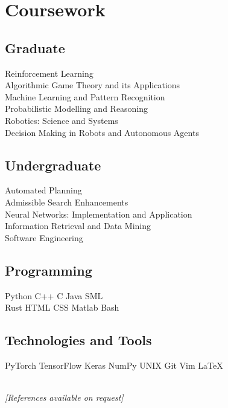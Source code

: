 \documentclass[]{lukas-cv}
\begin{document}
\begin{minipage}[t]{0.33\textwidth}
\section{Coursework}
\subsection{Graduate}
Reinforcement Learning \\
Algorithmic Game Theory and its Applications \\
Machine Learning and Pattern Recognition \\
Probabilistic Modelling and Reasoning \\
Robotics: Science and Systems \\
Decision Making in Robots and Autonomous Agents \\
\sectionsep

\subsection{Undergraduate}
Automated Planning \\
Admissible Search Enhancements \\
Neural Networks: Implementation and Application \\
Information Retrieval and Data Mining \\
Software Engineering \\
\sectionsep


\subsection{Programming}
Python \textbullet{} C++ \textbullet{} C \textbullet{} Java \textbullet{} SML
\ \vspace{0.3em} \\
Rust \textbullet{} HTML \textbullet{} CSS \textbullet{} Matlab \textbullet{} Bash \\
\sectionsep

\subsection{Technologies and Tools}
PyTorch \textbullet{} TensorFlow \textbullet{} Keras \textbullet{} NumPy \textbullet{} UNIX \textbullet{} Git \textbullet{} Vim \textbullet{} \LaTeX

\ \\
\small \textit{[References available on request]}

%
%

\end{minipage} 
\end{document}
